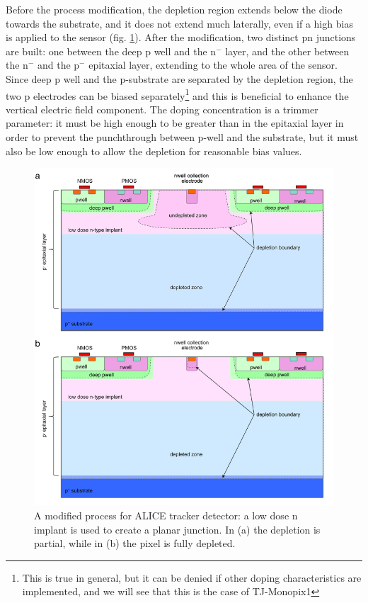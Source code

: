       Before the process modification, the depletion region extends below the diode towards the substrate, and it does not extend much laterally, even if a high bias is applied to the sensor (fig. \ref{fig:modified_process}). 
      After the modification, two distinct pn junctions are built: one between the deep p well and the n$^-$ layer, and the other between the n$^-$ and the p$^-$ epitaxial layer, extending to the whole area of the sensor.
      Since deep p well and the p-substrate are separated by the depletion region, the two p electrodes can be biased separately\footnote{This is true in general, but it can be denied if other doping characteristics are implemented, and we will see that this is the case of TJ-Monopix1} and this is beneficial to enhance the vertical electric field component.
      The doping concentration is a trimmer parameter: it must be high enough to be greater than in the epitaxial layer in order to prevent the punchthrough between p-well and the substrate, but it must also be low enough to allow the depletion for reasonable bias values.
      \begin{figure}
         \centering
         \includegraphics[width=.7\linewidth]{figures/Pixel_detectors/modified_process.png}
         \caption{A modified process for ALICE tracker detector: a low dose n implant is used to create a planar junction. In (a) the depletion is partial, while in (b) the pixel is fully depleted.}
         \label{fig:modified_process}
      \end{figure}

